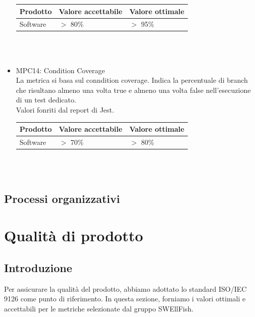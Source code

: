 \documentclass[12pt]{article}
\begin{document}
\begin{itemize}
	      \begin{center}
		      \begin{tabularx}{\textwidth}{|X|X|X|}
			      \hline
			      \textbf{Prodotto} & \textbf{Valore accettabile } & \textbf{Valore ottimale } \\
			      \hline
			      Software          & $>$ 80\%                     & $>$ 95\%                  \\
			      \hline
		      \end{tabularx}\\[8pt]
		      \mbox{}\\
	      \end{center}

	\item MPC14: Condition Coverage \\
	      La metrica si basa sul conndition coverage. Indica la percentuale di branch che risultano almeno una volta true e almeno una volta false nell'esecuzione di un test dedicato. \\
	      Valori fonriti dal report di Jest.

	      \begin{center}
		      \begin{tabularx}{\textwidth}{|X|X|X|}
			      \hline
			      \textbf{Prodotto} & \textbf{Valore accettabile } & \textbf{Valore ottimale } \\
			      \hline
			      Software          & $>$ 70\%                     & $>$ 80\%                  \\
			      \hline
		      \end{tabularx}\\[8pt]
		      \mbox{}\\
	      \end{center}

\end{itemize}


\subsection{Processi organizzativi}

\section{Qualità di prodotto}
\subsection{Introduzione}
Per assicurare la qualità del prodotto, abbiamo adottato lo standard ISO/IEC 9126 come punto di riferimento. In questa sezione, forniamo i valori ottimali e accettabili per le metriche selezionate dal gruppo SWEllFish.
\end{document}
